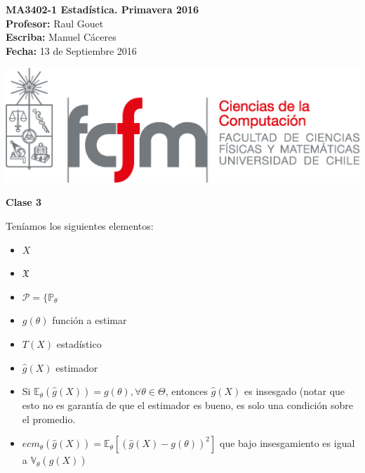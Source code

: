 \documentclass[10pt]{article}
\theoremstyle{plain}
\theoremstyle{definition}
\newcommand{\catnum}{3} %
\newcommand{\fecha}{13 de Septiembre 2016 }
\begin{document}
\vspace*{-1.2 cm}
\begin{minipage}{0.6\textwidth}
\begin{flushleft}
\hspace*{-0.5cm}\textbf{MA3402-1 Estadística. Primavera 2016}\\
\hspace*{-0.5cm}\textbf{Profesor:} Raul Gouet\\
\hspace*{-0.5cm}\textbf{Escriba:} Manuel Cáceres\\
\hspace*{-0.5cm}\textbf{Fecha:} \fecha
\end{flushleft}
\end{minipage}
\begin{minipage}{0.36\textwidth}
\begin{flushright}
\includegraphics[scale=0.3]{imagenes/fcfm_dcc}
\end{flushright}
\end{minipage}
\bigskip

\begin{center}
\LARGE\textbf{Clase \catnum}
\end{center}
Teníamos los siguientes elementos:
\begin{itemize}
\item $X$
\item $\mathfrak{X}$
\item $\mathcal{P} = \{\mathbb{P}_{\theta}$
\item $g(\theta)$ función a estimar
\item $T(X)$ estadístico
\item $\hat{g}(X)$ estimador
\item Si $\mathbb{E}_{\theta}(\hat{g}(X)) = g(\theta), \forall \theta \in \Theta$, entonces $\hat{g}(X)$  es insesgado (notar que esto no es garantía de que el estimador es bueno, es solo una condición sobre el promedio.
\item $ecm_{\theta}(\hat{g}(X)) = \mathbb{E}_{\theta}\left[(\hat{g}(X)-g(\theta))^2\right]$ que bajo insesgamiento es igual a $\mathbb{V}_{\theta}(\hat{g}(X))$
\end{itemize}
\end{document}
